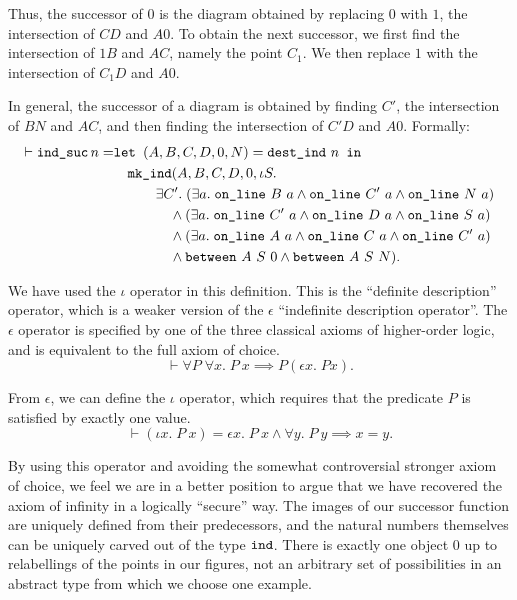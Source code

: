 Thus, the successor of $0$ is the diagram obtained by replacing $0$ with $1$, the intersection of $CD$ and $A0$. To obtain the next successor, we first find the intersection of $1B$ and $AC$, namely the point $C_1$. We then replace $1$ with the intersection of $C_1D$ and $A0$. 

In general, the successor of a diagram is obtained by finding $C'$, the intersection of $BN$ and $AC$, and then finding the intersection of $C'D$ and $A0$. Formally\label{sec:UseOfIota}:
\begin{align*}
\vdash \texttt{ind\_suc}\, n =& \texttt{let } (A,B,C,D,0,N) = \texttt{dest\_ind}\ n \texttt{ in}\\
&\quad \texttt{mk\_ind} (A,B,C,D,0,\iota S.\\
&\quad\qquad \exists C'.\; (\exists a.\;\texttt{on\_line}\ B\ a \wedge \texttt{on\_line}\ C'\ a \wedge \texttt{on\_line}\ N\ a)\\
&\qquad\qquad \wedge (\exists a.\;\texttt{on\_line}\ C'\ a \wedge \texttt{on\_line}\ D\ a \wedge \texttt{on\_line}\ S\ a)\\
&\qquad\qquad \wedge (\exists a.\;\texttt{on\_line}\ A\ a \wedge \texttt{on\_line}\ C\ a \wedge \texttt{on\_line}\ C'\ a)\\
&\qquad\qquad \wedge \texttt{between}\ A\ S\ 0 \wedge \texttt{between}\ A\ S\ N).
\end{align*}

We have used the $\iota$ operator in this definition. This is the ``definite description'' operator, which is a weaker version of the $\epsilon$ ``indefinite description operator''. The $\epsilon$ operator is specified by one of the three classical axioms of higher-order logic, and is equivalent to the full axiom of choice.
\begin{displaymath}
\vdash \forall P\;\forall x.\; P\ x \implies P (\epsilon x.\; P x).
\end{displaymath}

From $\epsilon$, we can define the $\iota$ operator, which requires that the predicate $P$ is satisfied by exactly one value. 
\begin{displaymath}
  \vdash (\iota x.\; P\ x) = \epsilon x.\; P\ x \wedge \forall y.\; P\ y \implies x = y.
\end{displaymath}

By using this operator and avoiding the somewhat controversial stronger axiom of choice, we feel we are in a better position to argue that we have recovered the axiom of infinity in a logically ``secure'' way. The images of our successor function are uniquely defined from their predecessors, and the natural numbers themselves can be uniquely carved out of the type $\texttt{ind}$. There is exactly one object $0$ up to relabellings of the points in our figures, not an arbitrary set of possibilities in an abstract type from which we choose one example.

